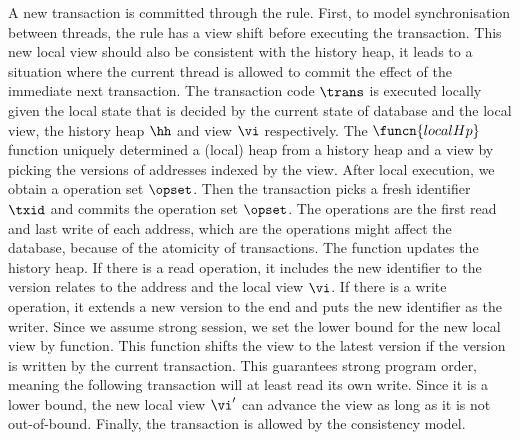 


A new transaction is committed through the  rule.
First, to model synchronisation between threads, the  rule has a view shift before executing the transaction.
This new local view should also be consistent with the history heap, \ie it leads to a situation where the current thread is allowed to commit the effect of the immediate next transaction.
The transaction code \( \trans \) is executed locally given the local state that is decided by the current state of database and the local view, \ie the history heap \( \hh \) and view \( \vi \) respectively.
The \( \funcn{localHp} \) function uniquely determined a (local) heap from a history heap and a view by picking the versions of addresses indexed by the view.
After local execution, we obtain a operation set \( \opset \).
Then the transaction picks a fresh identifier \( \txid \) and commits the operation set \( \opset \).
The operations are the first read and last write of each address, which are the operations might affect the database, because of the atomicity of transactions.
The  function updates the history heap.
If there is a read operation, it includes the new identifier to the version relates to the address and the local view \( \vi \).
If there is a write operation, it extends a new version to the end and puts the new identifier as the writer.
Since we assume strong session, we set the lower bound for the new local view by  function.
This function shifts the view to the latest version if the version is written by the current transaction.
This guarantees strong program order, meaning the following transaction will at least read its own write.
Since it is a lower bound, the new local view \( \vi' \) can advance the view as long as it is not out-of-bound.
Finally, the transaction is allowed by the consistency model.

